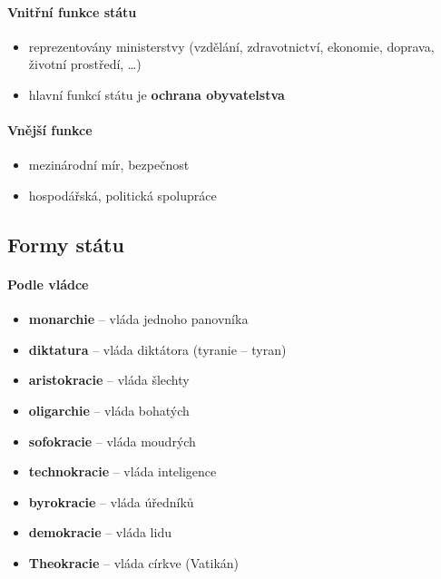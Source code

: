 \paragraph{Vnitřní funkce státu}
\begin{itemize}
\item reprezentovány ministerstvy (vzdělání, zdravotnictví, ekonomie, doprava, životní prostředí, \ldots)
\item hlavní funkcí státu je \textbf{ochrana obyvatelstva}
\end{itemize}

\paragraph{Vnější funkce}
\begin{itemize}
\item mezinárodní mír, bezpečnost
\item hospodářská, politická spolupráce
\end{itemize}


\subsection{Formy státu}
\paragraph{Podle vládce}
\begin{itemize}
\item \textbf{monarchie} -- vláda jednoho panovníka
\item \textbf{diktatura} -- vláda diktátora (tyranie -- tyran)
\item \textbf{aristokracie} -- vláda šlechty
\item \textbf{oligarchie} -- vláda bohatých
\item \textbf{sofokracie} -- vláda moudrých
\item \textbf{technokracie} -- vláda inteligence
\item \textbf{byrokracie} -- vláda úředníků
\item \textbf{demokracie} -- vláda lidu
\item \textbf{Theokracie} -- vláda církve (Vatikán)
\end{itemize}

